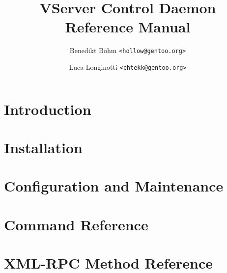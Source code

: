 \documentclass[10pt,oneside,halfparskip]{scrbook}
\title{VServer Control Daemon\\Reference Manual}
\author{Benedikt Böhm \texttt{<hollow@gentoo.org>} \and
Luca Longinotti \texttt{<chtekk@gentoo.org>}}
\begin{document}
\maketitle

\frontmatter
\setcounter{tocdepth}{1}
\tableofcontents


\mainmatter
\part{Introduction}
\label{pt:intro}




\part{Installation}
\label{pt:install}

\part{Configuration and Maintenance}
\label{pt:config}

\part{Command Reference}
\label{pt:cmdref}






\part{XML-RPC Method Reference}
\label{pt:rpcref}







\backmatter

\end{document}
